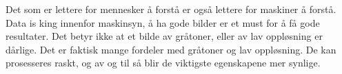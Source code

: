 Det som er lettere for mennesker å forstå er også lettere for maskiner å forstå. Data is king innenfor maskinsyn, å ha gode bilder er et must for å få gode resultater. Det betyr ikke at et bilde av gråtoner, eller av lav oppløsning er dårlige. Det er faktisk mange fordeler med gråtoner og lav oppløsning. De kan prosesseres raskt, og av og til så blir de viktigste egenskapene mer synlige.







